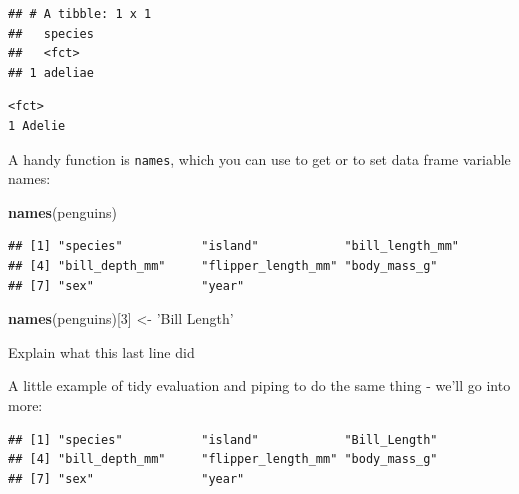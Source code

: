 \documentclass[
]{book}
\newenvironment{Shaded}{\begin{snugshade}}{\end{snugshade}}
\newcommand{\CommentTok}[1]{\textcolor[rgb]{0.56,0.35,0.01}{\textit{#1}}}
\newcommand{\DecValTok}[1]{\textcolor[rgb]{0.00,0.00,0.81}{#1}}
\newcommand{\KeywordTok}[1]{\textcolor[rgb]{0.13,0.29,0.53}{\textbf{#1}}}
\newcommand{\NormalTok}[1]{#1}
\newcommand{\OperatorTok}[1]{\textcolor[rgb]{0.81,0.36,0.00}{\textbf{#1}}}
\newcommand{\StringTok}[1]{\textcolor[rgb]{0.31,0.60,0.02}{#1}}
\begin{document}
\begin{verbatim}
## # A tibble: 1 x 1
##   species
##   <fct>  
## 1 adeliae
\end{verbatim}

\begin{verbatim}
<fct>  
1 Adelie
\end{verbatim}

A handy function is \texttt{names}, which you can use to get or to set data frame variable names:

\begin{Shaded}
\begin{Highlighting}[]
\KeywordTok{names}\NormalTok{(penguins)}
\end{Highlighting}
\end{Shaded}

\begin{verbatim}
## [1] "species"           "island"            "bill_length_mm"   
## [4] "bill_depth_mm"     "flipper_length_mm" "body_mass_g"      
## [7] "sex"               "year"
\end{verbatim}

\begin{Shaded}
\begin{Highlighting}[]
\KeywordTok{names}\NormalTok{(penguins)[}\DecValTok{3}\NormalTok{] <-}\StringTok{ 'Bill Length'}
\end{Highlighting}
\end{Shaded}

Explain what this last line did

A little example of tidy evaluation and piping to do the same thing - we'll go into more:

\begin{Shaded}
\end{Shaded}

\begin{verbatim}
## [1] "species"           "island"            "Bill_Length"      
## [4] "bill_depth_mm"     "flipper_length_mm" "body_mass_g"      
## [7] "sex"               "year"
\end{verbatim}
\end{document}
